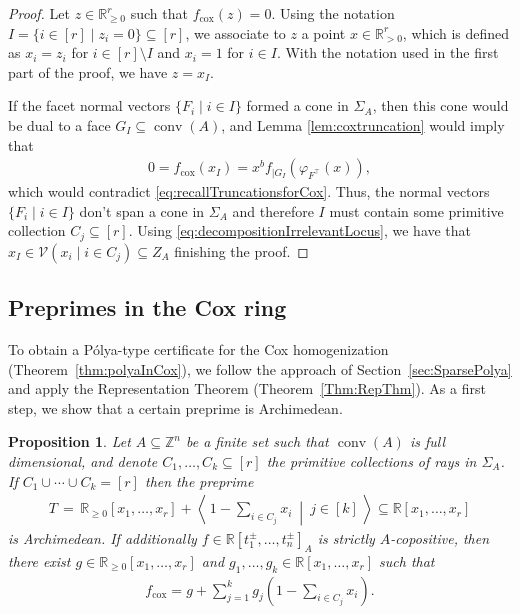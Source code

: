 \documentclass[a4paper,11pt]{amsart}
\newtheorem{proposition}[theorem]{Proposition}
\theoremstyle{definition}
\DeclareMathOperator{\conv}{conv}
\newcommand{\RR}{\mathbb{R}}
\newcommand{\cox}{\mathrm{cox}}
\begin{document}
\begin{proof}
Let $z \in \RR_{\geq 0}^r$ such that $f_\cox(z) = 0$. Using the notation $I = \{ i \in [r] \mid z_i = 0\} \subseteq [r]$, we associate to $z$ a point $x \in \RR^r_{>0}$, which is defined as $x_i = z_i$ for $i \in [r] \setminus I$ and $x_i = 1$ for $i \in I$. With the notation used in the first part of the proof, we have $z = x_I$.

If the facet normal vectors $\{F_i \mid i \in I\}$ formed a cone in $\Sigma_A$, then this cone would be dual to a face $G_I \subseteq\conv(A)$, and Lemma \ref{lem:coxtruncation} would imply that \begin{align*}
        0=f_\cox(x_I) =x^b f_{|G_I}(\varphi_{F^\top}(x)),
    \end{align*}
    which would contradict \eqref{eq:recallTruncationsforCox}.
    Thus, the normal vectors $\{F_i \mid i \in I\}$ don't span a cone in $\Sigma_A$ and therefore $I$ must contain some primitive collection $C_j \subseteq [r]$. Using \eqref{eq:decompositionIrrelevantLocus}, we have that $x_I \in \mathcal{V}(x_i \mid i\in C_j)\subseteq Z_A$ finishing the proof. 
\end{proof}

\subsection{Preprimes in the Cox ring}

To obtain a Pólya-type certificate for the Cox homogenization (Theorem~\ref{thm:polyaInCox}), we follow the approach of Section~\ref{sec:SparsePolya} and apply the Representation Theorem (Theorem~\ref{Thm:RepThm}). As a first step, we show that a certain preprime is Archimedean. 

\begin{proposition}
\label{Prop:CoxPolyaRepresentation}
Let $A\subseteq \mathbb{Z}^n$ be a finite set such that $\conv(A)$ is full dimensional, and denote $C_1,\dots,C_k \subseteq [r]$ the primitive collections of rays in $\Sigma_A$. If $C_1\cup \cdots \cup C_k=[r]$ then the preprime \begin{align*}
    T\,=\,\RR_{\geq0}[x_1,\dots,x_r]+\left\langle \, 1-\sum_{i\in C_j}x_i \ \middle| \ j\in [k]\,\right\rangle \subseteq \RR[x_1,\dots,x_r]
\end{align*}
is Archimedean. If additionally $f \in \RR[t_1^\pm, \dots, t_n^\pm]_A$ is strictly $A$-copositive, then there exist $g \in \mathbb{R}_{\geq 0}[x_1,\dots,x_r]$ and $g_1,\ldots,g_k\in \RR[x_1,\dots,x_r]$ such that
    \begin{align}
    \label{Eq:CoxPolyaRepresentation}
    f_\cox= g+\sum_{j=1}^k g_j\left(1-\sum_{i\in C_j}x_i\right).
\end{align}
\end{proposition}
\end{document}
